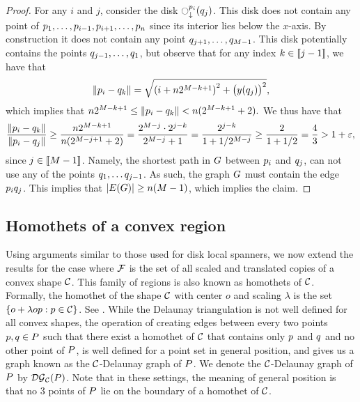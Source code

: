\documentclass[12pt]{article}%
\begin{document}
\begin{proof}
    For any $i$ and $j$, consider the disk
    $\diskVY{\pa_i}{\pb_j}$. This disk does not contain any point of
    $p_1,\ldots, p_{i-1}, p_{i+1}, \ldots, p_{n}$ since its
    interior lies below the $x$-axis. By construction it does not
    contain any point $q_{j+1}, \ldots, q_{M-1}$. This disk
    potentially contains the points $q_{j-1}, \ldots, q_1$, but
    observe that for any index $k \in \IRX{j-1}$, we have that
    \begin{equation*}
        \dY{\pa_i}{\pb_k} %
        =%
        \sqrt{ \pth{i + n 2^{M-k+1} }^2 + \bigl( y(\pb_j) \bigr)^2 },
    \end{equation*}
    which implies that
    \begin{math}
        n 2^{M-k+1}%
        \leq%
        \dY{\pa_i}{\pb_k} %
        <%
        n( 2^{M-k+1} +2).
    \end{math}
    We thus have that
    \begin{equation*}
        \frac{\dY{\pa_i}{\pb_k}}{\dY{\pa_i}{\pb_j}}
        \geq%
        \frac{n 2^{M-k+1}}{n( 2^{M-j+1} +2)}
        =%
        \frac{ 2^{M-j}\cdot 2^{j-k}}{ 2^{M-j} +1}
        =%
        \frac{  2^{j-k}}{ 1 + 1/2^{M-j}}
        \geq
        \frac{2}{1+1/2}
        = \frac{4}{3}
        > 1+\eps,
    \end{equation*}
    since $j \in \IRX{M-1}$.  Namely, the shortest path in $G$
    between $p_i$ and $q_j$, can not use any of the points
    $q_{1}, \ldots q_{j-1}$. As such, the graph $G$ must contain
    the edge $p_i q_j$. This implies that
    $|\EGX{\G}| \geq n (M-1)$, which implies the claim.
\end{proof}






\subsection{Homothets of a convex region}

Using arguments similar to those used for disk local spanners, we now
extend the results for the case where $\mathcal{F}$ is the set of all scaled
and translated copies of a convex shape $\mathcal{C}$. This family of regions
is also known as homothets of $\mathcal{C}$. Formally, the homothet of the
shape $\mathcal{C}$ with center $o$ and scaling $\lambda$ is the set
$\{o + \lambda o p : p \in \mathcal{C}\}$. See . While
the Delaunay triangulation is not well defined for all convex shapes,
the operation of creating edges between every two points
$p,q\in P$ such that there exist a homothet of $\mathcal{C}$ that
contains only $p$ and $q$ and no other point of $P$, is well
defined for a point set in general position, and gives us a graph
known as the $\mathcal{C}$-Delaunay graph of $P$. We denote the
$\mathcal{C}$-Delaunay graph of $P$ by $\mathcal{DG}_{\mathcal{C}}(P)$.  Note that in these
settings, the meaning of general position is that no 3 points of $P$
lie on the boundary of a homothet of $\mathcal{C}$.
\end{document}
